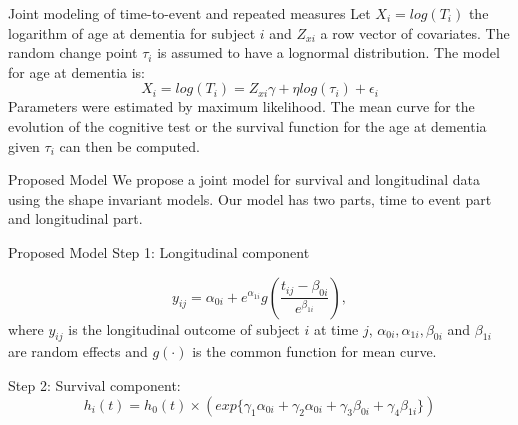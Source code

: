 \documentclass{beamer}
\begin{document}
\begin{frame}[t]{Joint modeling of time-to-event and repeated measures}\vspace{10pt}
Let $X_i = log(T_i)$ the logarithm of age at dementia for subject $i$ and $Z_{xi}$ a row vector of covariates. The random change point $\tau_i$ is assumed to have a lognormal
distribution. The model for age at dementia is:
\begin{equation}
X_i = log(T_i) = Z_{xi}\gamma+\eta log(\tau_i)+\epsilon_{i}
\end{equation}
Parameters were estimated by maximum likelihood. The mean curve for the evolution of the cognitive test or the survival function for the age at dementia given $\tau_i$ can then be computed.

\end{frame}



\begin{frame}[t]{Proposed Model}\vspace{10pt}
We propose a joint model for survival and longitudinal data using the shape invariant models. Our model has two parts, time to event part and longitudinal part.

\end{frame}

\begin{frame}[t]{Proposed Model}\vspace{10pt}
Step 1: Longitudinal component

\begin{equation}
y_{ij}=\alpha_{0i}+e^{\alpha_{1i}}g(\frac{t_{ij}-\beta_{0i}}{e^{\beta_{1i}}}),
\end{equation}
where $y_{ij}$ is the longitudinal outcome of subject $i$ at time $j$, $\alpha_{0i},\alpha_{1i}, \beta_{0i}$ and $\beta_{1i}$ are random effects and $g(\cdot)$ is the common function for mean curve. 

Step 2: Survival component:
\begin{equation}
h_i(t) = h_0(t) \times (exp\{\gamma_1\alpha_{0i}+\gamma_2\alpha_{0i}+\gamma_3\beta_{0i}+\gamma_4\beta_{1i}\})
\end{equation}
\end{frame}
\end{document}
